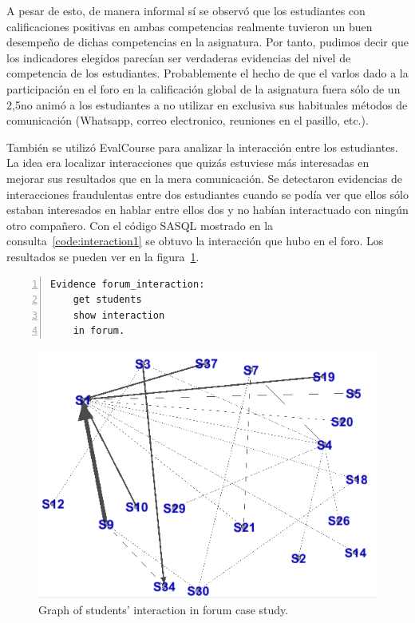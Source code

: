 A pesar de esto, de manera informal sí se observó que los estudiantes con calificaciones positivas en ambas competencias realmente tuvieron un buen desempeño de dichas competencias en la asignatura. Por tanto, pudimos decir que los indicadores elegidos parecían ser verdaderas evidencias del nivel de competencia de los estudiantes. Probablemente el hecho de que el varlos dado a la participación en el foro en la calificación global de la asignatura fuera sólo de un 2,5\percentage no animó a los estudiantes a no utilizar en exclusiva sus habituales métodos de comunicación (Whatsapp, correo electronico, reuniones en el pasillo, etc.).

También se utilizó EvalCourse para analizar la interacción entre los estudiantes. La idea era localizar interacciones que quizás estuviese más interesadas en mejorar sus resultados que en la mera comunicación. Se detectaron evidencias de interacciones fraudulentas entre dos estudiantes cuando se podía ver que ellos sólo estaban interesados en hablar entre ellos dos y no habían interactuado con ningún otro compañero. Con el código SASQL mostrado en la consulta~\ref{code:interaction1} se obtuvo la interacción que hubo en el foro. Los resultados se pueden ver en la figura~\ref{fig:EvcEvaluacionInteraccionForo2}.


\begin{lstlisting}[caption=Código SASQL para extraer datos sobre la interacción en el foro ,label=code:interaction1,numbers=left, captionpos=b, morekeywords={Evidence,get, students, show, milestones, participation, access, in, assignment, forum, campus, workshop, interaction}]
Evidence forum_interaction: 
	get students
	show interaction
	in forum.
\end{lstlisting}

\begin{figure}
	\centering
	\includegraphics[width=12cm]{EvcForo2.png}
	\caption{Graph of students' interaction in forum case study.}
	\label{fig:EvcEvaluacionInteraccionForo2}
\end{figure}

